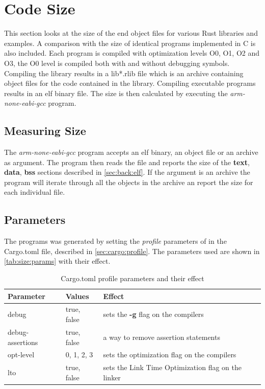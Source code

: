 \section{Code Size}

This section looks at the size of the end object files for various Rust libraries and examples.
A comparison with the size of identical programs implemented in C is also included.
Each program is compiled with optimization levels O0, O1, O2 and O3, the O0 level is compiled both with and without debugging symbols.
Compiling the library results in a lib*.rlib file which is an archive containing object files for the code contained in the library.
Compiling executable programs results in an elf binary file.
The size is then calculated by executing the \emph{arm-none-eabi-gcc} program.

\subsection{Measuring Size}

The \emph{arm-none-eabi-gcc} program accepts an elf binary, an object file or an archive as argument.
The program then reads the file and reports the size of the \textbf{text}, \textbf{data}, \textbf{bss} sections described in \autoref{sec:back:elf}.
If the argument is an archive the program will iterate through all the objects in the archive an report the size for each individual file.

\subsection{Parameters}
\label{sec:size:params}
The programs was generated by setting the \emph{profile} parameters of in the Cargo.toml file, described in \autoref{sec:cargo:profile}.
The parameters used are shown in \autoref{tab:size:params} with their effect.

\begin{table}[H]
  \centering
  \begin{tabular}{|l|l|l|}
    \hline
    Parameter & Values & Effect \\
    \hline
    debug & true, false & sets the \textbf{-g} flag on the compilers  \\
    debug-assertions & true, false & a way to remove assertion statements \\
    opt-level & 0, 1, 2, 3 & sets the optimization flag on the compilers \\
    lto & true, false & sets the Link Time Optimization flag on the linker \\
    \hline
  \end{tabular}
  \caption{Cargo.toml profile parameters and their effect}
  \label{tab:size:params}
\end{table}

